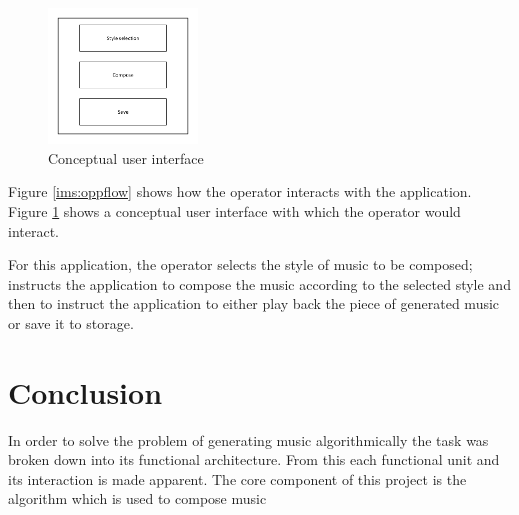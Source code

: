 \begin{figure}[ht]
\centerline{\includegraphics[width=150px]{../images/user_interface.pdf}}
\caption{Conceptual user interface}
\label{ims:conceptuserinterface}
\end{figure}

Figure \ref{ims:oppflow} shows how the operator interacts with the application. Figure \ref{ims:conceptuserinterface} shows a conceptual user interface with which the operator would interact.

For this application, the operator selects the style of music to be composed; instructs the application to compose the music according to the selected style and then to instruct the application to either play back the piece of generated music or save it to storage.

\chapter{Conclusion}
In order to solve the problem of generating music algorithmically the task was broken down into its functional architecture. From this each functional unit and its interaction is made apparent. The core component of this project is the algorithm which is used to compose music